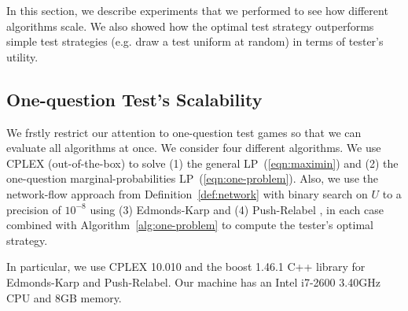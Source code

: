 \documentclass{article}
\begin{document}
In this section, we describe  experiments that we performed to see how
different algorithms scale. We also showed how the optimal test strategy
outperforms simple test strategies (e.g. draw a test uniform at random) in
terms of tester's utility.

\subsection{One-question Test's Scalability}
We frstly restrict our attention to one-question test games so that we can evaluate all algorithms at once.
We consider four different algorithms.  We use CPLEX (out-of-the-box)
to solve (1) the general LP~(\ref{eqn:maximin}) and (2) the one-question
marginal-probabilities LP~(\ref{eqn:one-problem}).  Also, we use the
network-flow approach from Definition~\ref{def:network} with binary search
on $U$ to a precision of $10^{-8}$ using (3) Edmonds-Karp \cite{Edmonds:1972} and (4)
Push-Relabel \cite{Goldberg:1988:NAM:48014.61051}, in each case combined with 
Algorithm~\ref{alg:one-problem} to compute the tester's optimal strategy.

In particular, we use CPLEX 10.010 and the boost 1.46.1 C++ library
for Edmonds-Karp and Push-Relabel.
Our machine has an
Intel i7-2600 3.40GHz CPU and 8GB memory.

\end{document}
